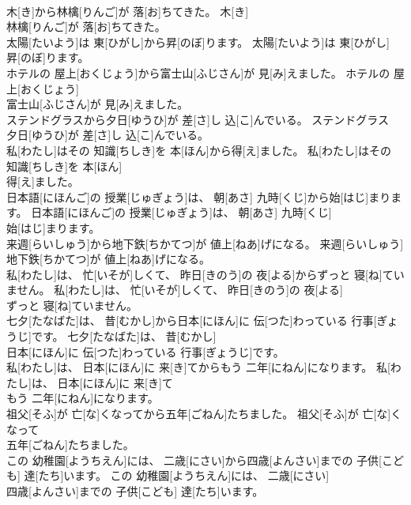 \documentclass[8pt]{extreport}
\begin{document}
\begin{CJK}{UTF8}{min}
\\	木[き]から林檎[りんご]が 落[お]ちてきた。	木[き]
\\	林檎[りんご]が 落[お]ちてきた。	
\\	太陽[たいよう]は 東[ひがし]から昇[のぼ]ります。	太陽[たいよう]は 東[ひがし]
\\	昇[のぼ]ります。	
\\	ホテルの 屋上[おくじょう]から富士山[ふじさん]が 見[み]えました。	ホテルの 屋上[おくじょう]
\\	富士山[ふじさん]が 見[み]えました。	
\\	ステンドグラスから夕日[ゆうひ]が 差[さ]し 込[こ]んでいる。	ステンドグラス
\\	夕日[ゆうひ]が 差[さ]し 込[こ]んでいる。	
\\	私[わたし]はその 知識[ちしき]を 本[ほん]から得[え]ました。	私[わたし]はその 知識[ちしき]を 本[ほん]
\\	得[え]ました。	
\\	日本語[にほんご]の 授業[じゅぎょう]は、 朝[あさ] 九時[くじ]から始[はじ]まります。	日本語[にほんご]の 授業[じゅぎょう]は、 朝[あさ] 九時[くじ]
\\	始[はじ]まります。	
\\	来週[らいしゅう]から地下鉄[ちかてつ]が 値上[ねあ]げになる。	来週[らいしゅう]
\\	地下鉄[ちかてつ]が 値上[ねあ]げになる。	
\\	私[わたし]は、 忙[いそが]しくて、 昨日[きのう]の 夜[よる]からずっと 寝[ね]ていません。	私[わたし]は、 忙[いそが]しくて、 昨日[きのう]の 夜[よる]
\\	ずっと 寝[ね]ていません。	
\\	七夕[たなばた]は、 昔[むかし]から日本[にほん]に 伝[つた]わっている 行事[ぎょうじ]です。	七夕[たなばた]は、 昔[むかし]
\\	日本[にほん]に 伝[つた]わっている 行事[ぎょうじ]です。	
\\	私[わたし]は、 日本[にほん]に 来[き]てからもう 二年[にねん]になります。	私[わたし]は、 日本[にほん]に 来[き]て
\\	もう 二年[にねん]になります。	
\\	祖父[そふ]が 亡[な]くなってから五年[ごねん]たちました。	祖父[そふ]が 亡[な]くなって
\\	五年[ごねん]たちました。	
\\	この 幼稚園[ようちえん]には、 二歳[にさい]から四歳[よんさい]までの 子供[こども] 達[たち]います。	この 幼稚園[ようちえん]には、 二歳[にさい]
\\	四歳[よんさい]までの 子供[こども] 達[たち]います。	

\end{CJK}
\end{document}
